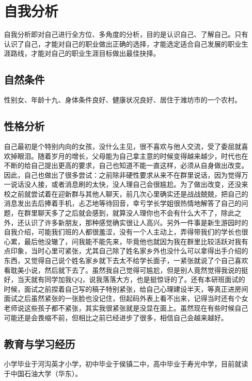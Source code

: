 \documentclass{article}
\begin{document}
\thispagestyle{empty}
\newpage
\setcounter{page}{1}
\section{自我分析}
	自我分析即对自己进行全方位、多角度的分析，目的是认识自己、了解自己。只有认识了自己，才能对自己的职业做出正确的选择，才能选定适合自己发展的职业生涯路线，才能对自己的职业生涯目标做出最佳抉择。\par
\subsection{自然条件}
性别女、年龄十九、身体条件良好、健康状况良好、居住于潍坊市的一个农村。\par
\subsection{性格分析}
自己最初是个特别内向的女孩，没什么主见，很不喜欢与他人交流，受了委屈就喜欢掉眼泪。随着岁月的增长，父母能为自己拿主意的时候变得越来越少，时代也在不断的给自己提出更高的要求，自己也知道不能一直这样，必须从自身做出改变。因此，自己也做出了很多尝试：之前除非硬性要求从来不在群里说话，因为觉得万一说话没人接，或者消息刷的太快，没人理自己会很尴尬。为了做出改变，还没来校之前就尝试着在迎新群与其他人聊天，前几次心里确实还是战战兢兢，把自己的消息发出去后捧着手机，忐忑地等待回音，幸亏学长学姐很热情地解答了自己的问题，在群里聊天多了之后就会感到，就算没人理你也不会有什么大不了，除此之外，还认识了许多新朋友，那种感觉确实很让人高兴。另外一件事是新生游园时的自我介绍，可能我们班的人都很羞涩，没有一个人主动上，弄得带我们的学长也很心累，最后他没辙了，问我能不能先来，毕竟他也就因为我在群里比较活跃对我有点印象，当时心里可紧张，尤其自己除了姓名家乡外也没什么可以拿得出手介绍的东西，又觉得自己说个姓名家乡就下去太不给学长面子，一紧张就说了个自己喜欢看耽美小说，然后就下去了。虽然我自己觉得可尴尬，但是别人竟然觉得我说的挺好，当天就有同学加我QQ，说我落落大方，也是挺惊讶的了。还有本研班面试的时候，面试之前捏着自己写的稿子特别紧张，给自己心理建设半天，等真正进房间面试之后虽然紧张的一张脸也没记住，但起码外表上看不出来，记得当时还有个女老师说这些孩子都不紧张，其实我很紧张就是没显在面上。虽然现在有些时候自己可能还是会畏缩不前，但相比之前已经进步了很多，相信自己会越来越好。\par
\subsection{教育与学习经历}
小学毕业于河沟英才小学，初中毕业于侯镇二中，高中毕业于寿光中学，目前就读于中国石油大学（华东）。\par
\end{document}

